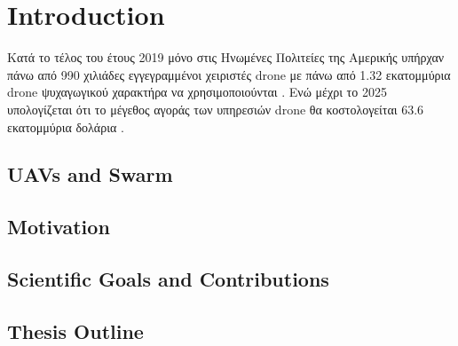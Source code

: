 \chapter{Introduction} %
\label{chap:Chapter1}  %

Κατά το τέλος του έτους 2019 μόνο στις Ηνωμένες Πολιτείες της Αμερικής υπήρχαν πάνω από 
990 χιλιάδες εγγεγραμμένοι χειριστές drone με πάνω από 1.32 εκατομμύρια drone ψυχαγωγικού 
χαρακτήρα να χρησιμοποιούνται \cite{2019-drone-statistic}. Ενώ μέχρι το 2025 υπολογίζεται 
ότι το μέγεθος αγοράς των υπηρεσιών drone θα κοστολογείται 63.6 εκατομμύρια δολάρια \cite{expected-drone-market}.

\section{UAVs and Swarm}
\label{sec:Chapter1-1} 

\section{Motivation}
\label{sec:Chapter1-2} 

\section{Scientific Goals and Contributions}
\label{sec:Chapter1-3} 

\section{Thesis Outline}
\label{sec:Chapter1-4} 

